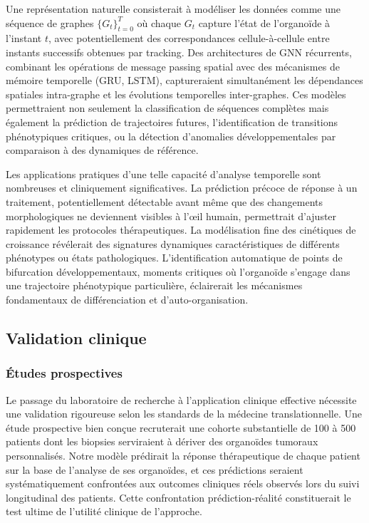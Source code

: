 Une représentation naturelle consisterait à modéliser les données comme une séquence de graphes $\{G_t\}_{t=0}^T$ où chaque $G_t$ capture l'état de l'organoïde à l'instant $t$, avec potentiellement des correspondances cellule-à-cellule entre instants successifs obtenues par tracking. Des architectures de GNN récurrents, combinant les opérations de message passing spatial avec des mécanismes de mémoire temporelle (GRU, LSTM), captureraient simultanément les dépendances spatiales intra-graphe et les évolutions temporelles inter-graphes. Ces modèles permettraient non seulement la classification de séquences complètes mais également la prédiction de trajectoires futures, l'identification de transitions phénotypiques critiques, ou la détection d'anomalies développementales par comparaison à des dynamiques de référence.

Les applications pratiques d'une telle capacité d'analyse temporelle sont nombreuses et cliniquement significatives. La prédiction précoce de réponse à un traitement, potentiellement détectable avant même que des changements morphologiques ne deviennent visibles à l'œil humain, permettrait d'ajuster rapidement les protocoles thérapeutiques. La modélisation fine des cinétiques de croissance révélerait des signatures dynamiques caractéristiques de différents phénotypes ou états pathologiques. L'identification automatique de points de bifurcation développementaux, moments critiques où l'organoïde s'engage dans une trajectoire phénotypique particulière, éclairerait les mécanismes fondamentaux de différenciation et d'auto-organisation.

\subsection{Validation clinique}

\subsubsection{Études prospectives}

Le passage du laboratoire de recherche à l'application clinique effective nécessite une validation rigoureuse selon les standards de la médecine translationnelle. Une étude prospective bien conçue recruterait une cohorte substantielle de 100 à 500 patients dont les biopsies serviraient à dériver des organoïdes tumoraux personnalisés. Notre modèle prédirait la réponse thérapeutique de chaque patient sur la base de l'analyse de ses organoïdes, et ces prédictions seraient systématiquement confrontées aux outcomes cliniques réels observés lors du suivi longitudinal des patients. Cette confrontation prédiction-réalité constituerait le test ultime de l'utilité clinique de l'approche.


